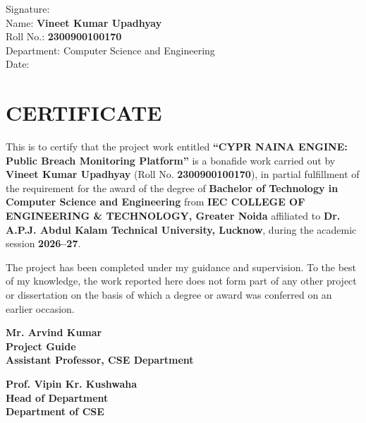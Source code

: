 \documentclass[12pt,a4paper,oneside]{report}
\begin{document}
\vspace{1.5cm}
\noindent Signature: \underline{\hspace{5cm}}\\[0.3cm]
\noindent Name: \textbf{Vineet Kumar Upadhyay}\\
\noindent Roll No.: \textbf{2300900100170}\\
\noindent Department: Computer Science and Engineering\\
\noindent Date: \underline{\hspace{4cm}}

\clearpage

\chapter*{CERTIFICATE}
This is to certify that the project work entitled \textbf{``CYPR NAINA ENGINE: Public Breach Monitoring Platform''} is a bonafide work carried out by \textbf{Vineet Kumar Upadhyay} (Roll No. \textbf{2300900100170}), in partial fulfillment of the requirement for the award of the degree of \textbf{Bachelor of Technology in Computer Science and Engineering} from \textbf{IEC COLLEGE OF ENGINEERING \& TECHNOLOGY, Greater Noida} affiliated to \textbf{Dr. A.P.J. Abdul Kalam Technical University, Lucknow}, during the academic session \textbf{2026--27}.

The project has been completed under my guidance and supervision. To the best of my knowledge, the work reported here does not form part of any other project or dissertation on the basis of which a degree or award was conferred on an earlier occasion.

\vspace{3cm}

\noindent
\begin{minipage}{0.45\textwidth}
\raggedright
\vspace{1.2cm}
\textbf{Mr. Arvind Kumar}\\
\textbf{Project Guide}\\
\textbf{Assistant Professor, CSE Department}
\end{minipage}%
\hfill
\begin{minipage}{0.45\textwidth}
\raggedleft
\vspace{1.2cm}
\textbf{Prof. Vipin Kr. Kushwaha}\\
\textbf{Head of Department}\\
\textbf{Department of CSE}
\end{minipage}
\clearpage
\end{document}
